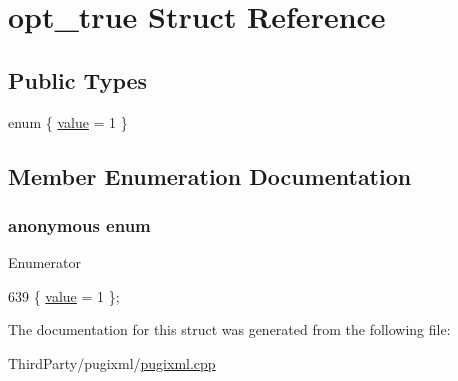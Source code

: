 \hypertarget{structopt__true}{\section{opt\-\_\-true Struct Reference}
\label{structopt__true}
}
\subsection*{Public Types}
\begin{DoxyCompactItemize}
\item 
enum \{ \hyperlink{structopt__true_a93a7039f202aca3a935c98aa8e069ea5a3f8405655cc98a5710236f177e042b72}{value} = 1
 \}
\end{DoxyCompactItemize}


\subsection{Member Enumeration Documentation}
\hypertarget{structopt__true_a93a7039f202aca3a935c98aa8e069ea5}{\subsubsection[{anonymous enum}]{\setlength{\rightskip}{0pt plus 5cm}anonymous enum}}\label{structopt__true_a93a7039f202aca3a935c98aa8e069ea5}
\begin{Desc}
\item[Enumerator]\par
\begin{description}
\item[{\em 
\hypertarget{structopt__true_a93a7039f202aca3a935c98aa8e069ea5a3f8405655cc98a5710236f177e042b72}{value}\label{structopt__true_a93a7039f202aca3a935c98aa8e069ea5a3f8405655cc98a5710236f177e042b72}
}]\end{description}
\end{Desc}

\begin{DoxyCode}
639 \{ \hyperlink{structopt__true_a93a7039f202aca3a935c98aa8e069ea5a3f8405655cc98a5710236f177e042b72}{value} = 1 \};
\end{DoxyCode}


The documentation for this struct was generated from the following file\-:\begin{DoxyCompactItemize}
\item 
Third\-Party/pugixml/\hyperlink{pugixml_8cpp}{pugixml.\-cpp}\end{DoxyCompactItemize}
